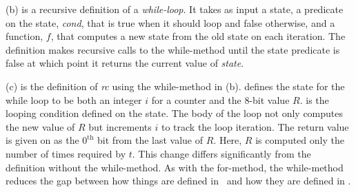(b) is a recursive definition of a \emph{while-loop}.
It takes as input a state, a predicate on the state, \emph{cond}, that is true when it should loop and false otherwise, and a function, $f$, that computes a new state from the old state on each iteration.
The definition makes recursive calls to the while-method until the state predicate is false at which point it returns the current value of \emph{state}.

(c) is the definition of \emph{rc} using the while-method in (b).
 defines the state for the while loop to be both an integer $i$ for a counter and the 8-bit value $R$.
 is the looping condition defined on the state.
The body of the loop not only computes the new value of $R$ but  increments $i$ to track the loop iteration.
The return value is given on  as the $0^\mathrm{th}$ bit from the last value of $R$.
Here, $R$ is computed only the number of times required by $t$.
This change differs significantly from the definition without the while-method.
As with the for-method, the while-method reduces the gap between how things are defined in \fips\ and how they are defined in \cryptol.

